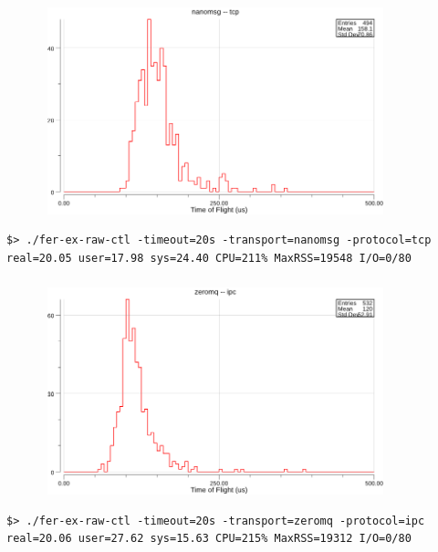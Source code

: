 \documentclass[9pt]{beamer}
\begin{document}
\begin{frame}[fragile]
\frametitle{}


\begin{figure}[h]
\begin{center}
\includegraphics[width=10cm,height=6cm]{_figs/tof-nanomsg-tcp.png}
\end{center}

\end{figure}


\begin{verbatim}
$> ./fer-ex-raw-ctl -timeout=20s -transport=nanomsg -protocol=tcp
real=20.05 user=17.98 sys=24.40 CPU=211% MaxRSS=19548 I/O=0/80

\end{verbatim}



\end{frame}

\begin{frame}[fragile]
\frametitle{}


\begin{figure}[h]
\begin{center}
\includegraphics[width=10cm,height=6cm]{_figs/tof-zeromq-ipc.png}
\end{center}

\end{figure}


\begin{verbatim}
$> ./fer-ex-raw-ctl -timeout=20s -transport=zeromq -protocol=ipc
real=20.06 user=27.62 sys=15.63 CPU=215% MaxRSS=19312 I/O=0/80

\end{verbatim}



\end{frame}
\end{document}
